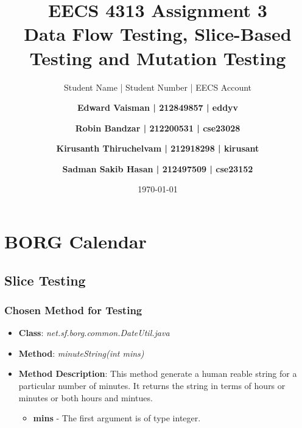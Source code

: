 \documentclass[fontsize=12pt,paper=letter,twoside]{scrartcl}
\author{Student Name | Student Number | EECS Account
\and \textbf{Edward Vaisman | 212849857 | eddyv}
\and \textbf{Robin Bandzar | 212200531 | cse23028}
\and \textbf{Kirusanth Thiruchelvam | 212918298 | kirusant}
\and \textbf{Sadman Sakib Hasan | 212497509 | cse23152}
}
\date{\today} %
\begin{document}
\title{EECS 4313 Assignment 3 \\Data Flow Testing, Slice-Based Testing and Mutation Testing}
\maketitle

\newpage

\tableofcontents


\newpage


\section{BORG Calendar}

\subsection{Slice Testing}

\subsubsection{Chosen Method for Testing}

\begin{itemize}
\item \textbf{Class}: \emph{net.sf.borg.common.DateUtil.java}
\item \textbf{Method}: \emph{minuteString(int mins)}
\item \textbf{Method Description}:
This method generate a human reable string for a particular number of minutes. It returns the string in terms of hours or minutes or both hours and mintues.
\begin{itemize}
\item \textbf{mins} - The first argument is of type integer.
\end{itemize}
\end{itemize}
\end{document}
